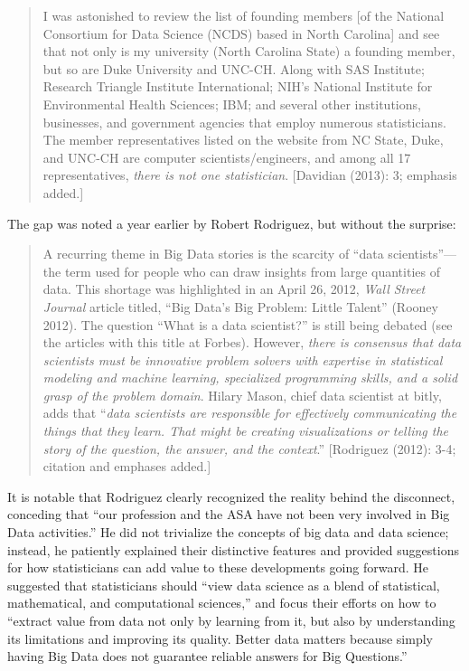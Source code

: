 \documentclass[
  letterpaper,
]{report}
\begin{document}
\begin{quote}
I was astonished to review the list of founding members {[}of the
National Consortium for Data Science (NCDS) based in North Carolina{]}
and see that not only is my university (North Carolina State) a founding
member, but so are Duke University and UNC-CH. Along with SAS Institute;
Research Triangle Institute International; NIH's National Institute for
Environmental Health Sciences; IBM; and several other institutions,
businesses, and government agencies that employ numerous statisticians.
The member representatives listed on the website from NC State, Duke,
and UNC-CH are computer scientists/engineers, and among all 17
representatives, \emph{there is not one statistician}. {[}Davidian
(2013): 3; emphasis added.{]}
\end{quote}

The gap was noted a year earlier by Robert Rodriguez, but without the
surprise:

\begin{quote}
A recurring theme in Big Data stories is the scarcity of ``data
scientists''---the term used for people who can draw insights from large
quantities of data. This shortage was highlighted in an April 26, 2012,
\emph{Wall Street Journal} article titled, ``Big Data's Big Problem:
Little Talent'' (Rooney 2012). The question ``What is a data
scientist?'' is still being debated (see the articles with this title at
Forbes). However, \emph{there is consensus that data scientists must be
innovative problem solvers with expertise in statistical modeling and
machine learning, specialized programming skills, and a solid grasp of
the problem domain}. Hilary Mason, chief data scientist at bitly, adds
that ``\emph{data scientists are responsible for effectively
communicating the things that they learn. That might be creating
visualizations or telling the story of the question, the answer, and the
context}.'' {[}Rodriguez (2012): 3-4; citation and emphases added.{]}
\end{quote}

It is notable that Rodriguez clearly recognized the reality behind the
disconnect, conceding that ``our profession and the ASA have not been
very involved in Big Data activities.'' He did not trivialize the
concepts of big data and data science; instead, he patiently explained
their distinctive features and provided suggestions for how
statisticians can add value to these developments going forward. He
suggested that statisticians should ``view data science as a blend of
statistical, mathematical, and computational sciences,'' and focus their
efforts on how to ``extract value from data not only by learning from
it, but also by understanding its limitations and improving its quality.
Better data matters because simply having Big Data does not guarantee
reliable answers for Big Questions.''
\end{document}
